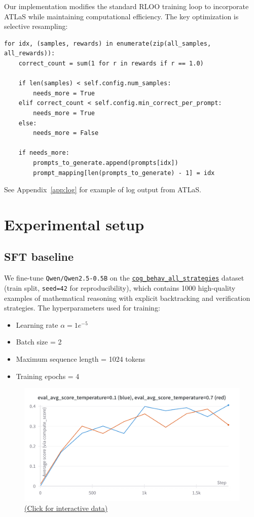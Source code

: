 \documentclass{article}
\begin{document}
Our implementation modifies the standard RLOO training loop to incorporate ATLaS while maintaining computational efficiency. The key optimization is selective resampling:

\begin{lstlisting}[style=python]
for idx, (samples, rewards) in enumerate(zip(all_samples, all_rewards)):
    correct_count = sum(1 for r in rewards if r == 1.0)
    
    if len(samples) < self.config.num_samples:
        needs_more = True
    elif correct_count < self.config.min_correct_per_prompt:
        needs_more = True
    else:
        needs_more = False
    
    if needs_more:
        prompts_to_generate.append(prompts[idx])
        prompt_mapping[len(prompts_to_generate) - 1] = idx
\end{lstlisting}

See Appendix~\ref{app:log} for example of log output from ATLaS.

\section{Experimental setup}

\subsection{SFT baseline}

We fine-tune \texttt{Qwen/Qwen2.5-0.5B} on the \texttt{\href{https://huggingface.co/datasets/Asap7772/cog_behav_all_strategies}{cog\_behav\_all\_strategies}} dataset (train split, \texttt{seed=42} for reproducibility), which contains 1000 high-quality examples of mathematical reasoning with explicit backtracking and verification strategies. The hyperparameters used for training:
\begin{itemize}
    \item Learning rate $\alpha = 1e^{-5}$
    \item Batch size = 2
    \item Maximum sequence length = 1024 tokens
    \item Training epochs = 4
\end{itemize}

\begin{figure}[H]
  \centering
  \includegraphics[width=0.8\columnwidth]{sft.png}
  \vspace{-10pt}
  \caption*{\href{https://wandb.ai/jonathanalgar/cs224r-project-sft-baseline/runs/d6osiygw/panel/w5ubogq9o}{(Click for interactive data)}}
\end{figure}
\end{document}
